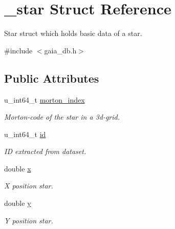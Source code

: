 \hypertarget{struct__star}{}\section{\+\_\+star Struct Reference}
\label{struct__star}


Star struct which holds basic data of a star.  




{\ttfamily \#include $<$gaia\+\_\+db.\+h$>$}

\subsection*{Public Attributes}
\begin{DoxyCompactItemize}
\item 
\mbox{\label{struct__star_ada0104a0c6633bf55193b3d6e55e6b3c}} 
u\+\_\+int64\+\_\+t \mbox{\hyperlink{struct__star_ada0104a0c6633bf55193b3d6e55e6b3c}{morton\+\_\+index}}
\begin{DoxyCompactList}\small\item\em Morton-\/code of the star in a 3d-\/grid. \end{DoxyCompactList}\item 
\mbox{\label{struct__star_a6b571bc027dfc8c30bad11bfce07a23c}} 
u\+\_\+int64\+\_\+t \mbox{\hyperlink{struct__star_a6b571bc027dfc8c30bad11bfce07a23c}{id}}
\begin{DoxyCompactList}\small\item\em ID extracted from dataset. \end{DoxyCompactList}\item 
\mbox{\label{struct__star_aa0894b982143e830a7c2b979de63fe69}} 
double \mbox{\hyperlink{struct__star_aa0894b982143e830a7c2b979de63fe69}{x}}
\begin{DoxyCompactList}\small\item\em X position star. \end{DoxyCompactList}\item 
\mbox{\label{struct__star_a00d87762a797270a59f86b3e5bd82c0e}} 
double \mbox{\hyperlink{struct__star_a00d87762a797270a59f86b3e5bd82c0e}{y}}
\begin{DoxyCompactList}\small\item\em Y position star. \end{DoxyCompactList}\item 

\end{DoxyCompactItemize}
